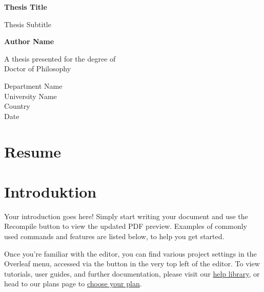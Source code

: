 \documentclass{article}
\begin{document}
    \begin{titlepage}
        \begin{center}
            \vspace*{1cm}

            \textbf{Thesis Title}

            \vspace{0.5cm}
            Thesis Subtitle

            \vspace{1.5cm}

            \textbf{Author Name}

            \vfill

            A thesis presented for the degree of\\
            Doctor of Philosophy

            \vspace{0.8cm}



            Department Name\\
            University Name\\
            Country\\
            Date

        \end{center}
    \end{titlepage}

    \newpage



    \tableofcontents


    \section{Resume}\label{sec:resume}


    \section{Introduktion}\label{sec:introduktion}

    Your introduction goes here! Simply start writing your document and use the Recompile button to view the 
    updated PDF preview. Examples of commonly used commands and features are listed below, to help you get started.

    Once you're familiar with the editor, you can find various project settings in the Overleaf menu, accessed 
    via the button in the very top left of the editor. To view tutorials, user guides, and further documentation, 
    please visit our \href{https://www.overleaf.com/learn}{help library}, or head to our plans page to 
    \href{https://www.overleaf.com/user/subscription/plans}{choose your plan}.
\end{document}
